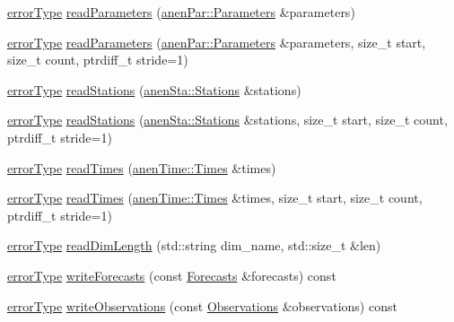 \begin{DoxyCompactItemize}
\item 
\mbox{\hyperlink{class_an_en_i_o_aa56bc1ec6610b86db4349bce20f9ead0}{error\+Type}} \mbox{\hyperlink{class_an_en_i_o_a2b21ff04fcc0464017a5a717a6b19065}{read\+Parameters}} (\mbox{\hyperlink{classanen_par_1_1_parameters}{anen\+Par\+::\+Parameters}} \&parameters)
\item 
\mbox{\hyperlink{class_an_en_i_o_aa56bc1ec6610b86db4349bce20f9ead0}{error\+Type}} \mbox{\hyperlink{class_an_en_i_o_a0ff7e8d615ed2127ab66b83ee78fc820}{read\+Parameters}} (\mbox{\hyperlink{classanen_par_1_1_parameters}{anen\+Par\+::\+Parameters}} \&parameters, size\+\_\+t start, size\+\_\+t count, ptrdiff\+\_\+t stride=1)
\item 
\mbox{\hyperlink{class_an_en_i_o_aa56bc1ec6610b86db4349bce20f9ead0}{error\+Type}} \mbox{\hyperlink{class_an_en_i_o_aaec8b46a52f3d8ab904fd4229bd3b9e9}{read\+Stations}} (\mbox{\hyperlink{classanen_sta_1_1_stations}{anen\+Sta\+::\+Stations}} \&stations)
\item 
\mbox{\hyperlink{class_an_en_i_o_aa56bc1ec6610b86db4349bce20f9ead0}{error\+Type}} \mbox{\hyperlink{class_an_en_i_o_ad0f7a1db44e12f42d4602898c0f51faa}{read\+Stations}} (\mbox{\hyperlink{classanen_sta_1_1_stations}{anen\+Sta\+::\+Stations}} \&stations, size\+\_\+t start, size\+\_\+t count, ptrdiff\+\_\+t stride=1)
\item 
\mbox{\hyperlink{class_an_en_i_o_aa56bc1ec6610b86db4349bce20f9ead0}{error\+Type}} \mbox{\hyperlink{class_an_en_i_o_a19b454b0a9ecb5ecbc2cc2a9c139770b}{read\+Times}} (\mbox{\hyperlink{classanen_time_1_1_times}{anen\+Time\+::\+Times}} \&times)
\item 
\mbox{\hyperlink{class_an_en_i_o_aa56bc1ec6610b86db4349bce20f9ead0}{error\+Type}} \mbox{\hyperlink{class_an_en_i_o_aecbace06ce451ccad367d0150ef6aaf9}{read\+Times}} (\mbox{\hyperlink{classanen_time_1_1_times}{anen\+Time\+::\+Times}} \&times, size\+\_\+t start, size\+\_\+t count, ptrdiff\+\_\+t stride=1)
\item 
\mbox{\hyperlink{class_an_en_i_o_aa56bc1ec6610b86db4349bce20f9ead0}{error\+Type}} \mbox{\hyperlink{class_an_en_i_o_a5ca1c7df3da9720967d7ed06f2dfe09b}{read\+Dim\+Length}} (std\+::string dim\+\_\+name, std\+::size\+\_\+t \&len)
\item 
\mbox{\hyperlink{class_an_en_i_o_aa56bc1ec6610b86db4349bce20f9ead0}{error\+Type}} \mbox{\hyperlink{class_an_en_i_o_abc5b12bc4692f3ac303fa5430aecaf4c}{write\+Forecasts}} (const \mbox{\hyperlink{class_forecasts}{Forecasts}} \&forecasts) const
\item 
\mbox{\hyperlink{class_an_en_i_o_aa56bc1ec6610b86db4349bce20f9ead0}{error\+Type}} \mbox{\hyperlink{class_an_en_i_o_ae89350e02d93439e79aa76068062490a}{write\+Observations}} (const \mbox{\hyperlink{class_observations}{Observations}} \&observations) const

\end{DoxyCompactItemize}
